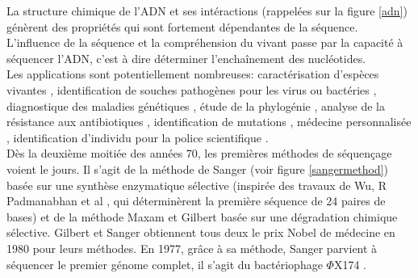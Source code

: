 \documentclass[a4paper,11pt]{article}
\begin{document}
La structure chimique de l'ADN et ses intéractions (rappelées sur la figure \ref{adn}) génèrent des propriétés qui sont fortement dépendantes de la séquence. L'influence de la séquence et la compréhension du vivant passe par la capacité à séquencer l'ADN, c'est à dire déterminer l'enchaînement des nucléotides. \\

Les applications sont potentiellement nombreuses: caractérisation d'espèces vivantes \cite{Sanggaard2014}, identification de souches pathogènes pour les virus ou bactéries \cite{Janda2007}, diagnostique des maladies génétiques \cite{Saunders2012}, étude de la phylogénie \cite{Neves2011}, analyse de la résistance aux antibiotiques  \cite{Davies2010}, identification de mutations \cite{Schneeberger2009}, médecine personnalisée \cite{Hamburg2010}, identification d'individu pour la police scientifique \cite{Wilson1995}.\\


Dès la deuxième moitiée des années 70, les premières méthodes de séquençage voient le jours. Il s'agit de la méthode de Sanger \cite{Sanger1975} (voir figure \ref{sangermethod}) basée sur une synthèse enzymatique sélective (inspirée des travaux de Wu, R Padmanabhan et al \cite{WU1972}, qui déterminèrent la première séquence de 24 paires de bases) et de la méthode Maxam et Gilbert \cite{Maxam1977} basée sur une dégradation chimique sélective. Gilbert et Sanger obtiennent tous deux le prix Nobel de médecine en 1980 pour leurs méthodes. En 1977, grâce à sa méthode, Sanger parvient à séquencer le premier génome complet, il s'agit du bactériophage $\Phi$X174 \cite{Sanger1977}.\\
\end{document}
